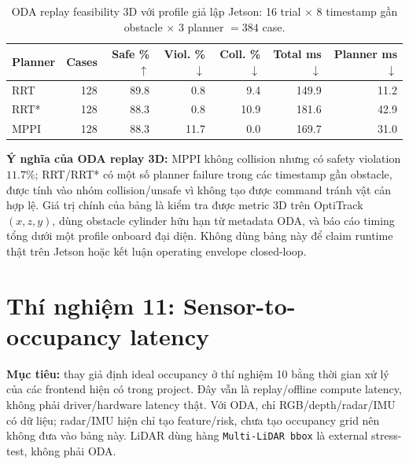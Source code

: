 \documentclass[10pt,a4paper]{article}
\newcommand{\code}[1]{\texttt{#1}}
\begin{document}
\begin{table}[H]
\centering
\small
\caption{ODA replay feasibility 3D với profile giả lập Jetson: 16 trial \(\times\) 8 timestamp gần obstacle \(\times\) 3 planner \(=384\) case.}
\begin{tabular}{lrrrrrr}
\toprule
Planner & Cases & Safe \% $\uparrow$ & Viol. \% $\downarrow$ & Coll. \% $\downarrow$ & Total ms $\downarrow$ & Planner ms $\downarrow$ \\
\midrule
RRT & 128 & 89.8 & 0.8 & 9.4 & 149.9 & 11.2 \\
RRT* & 128 & 88.3 & 0.8 & 10.9 & 181.6 & 42.9 \\
MPPI & 128 & 88.3 & 11.7 & 0.0 & 169.7 & 31.0 \\
\bottomrule
\end{tabular}
\end{table}

\textbf{Ý nghĩa của ODA replay 3D:} MPPI không collision nhưng có safety violation \(11.7\%\); RRT/RRT* có một số planner failure trong các timestamp gần obstacle, được tính vào nhóm collision/unsafe vì không tạo được command tránh vật cản hợp lệ. Giá trị chính của bảng là kiểm tra được metric 3D trên OptiTrack \((x,z,y)\), dùng obstacle cylinder hữu hạn từ metadata ODA, và báo cáo timing tổng dưới một profile onboard đại diện. Không dùng bảng này để claim runtime thật trên Jetson hoặc kết luận operating envelope closed-loop.

\section{Thí nghiệm 11: Sensor-to-occupancy latency}

\textbf{Mục tiêu:} thay giả định ideal occupancy ở thí nghiệm 10 bằng thời gian xử lý của các frontend hiện có trong project. Đây vẫn là replay/offline compute latency, không phải driver/hardware latency thật. Với ODA, chỉ RGB/depth/radar/IMU có dữ liệu; radar/IMU hiện chỉ tạo feature/risk, chưa tạo occupancy grid nên không đưa vào bảng này. LiDAR dùng hàng \code{Multi-LiDAR bbox} là external stress-test, không phải ODA.
\end{document}

